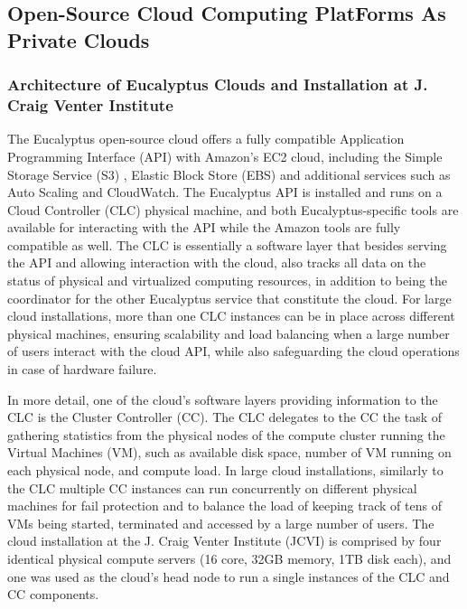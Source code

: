 \documentclass[10pt]{bmc_article}
\newenvironment{bmcformat}{\baselineskip20pt\sloppy\setboolean{publ}{false}}{\baselineskip20pt\sloppy}
\begin{document}
\begin{bmcformat}
\subsection*{Open-Source Cloud Computing PlatForms As Private Clouds} 

\subsubsection*{Architecture of Eucalyptus Clouds and Installation at J. Craig Venter Institute}

The Eucalyptus open-source cloud \cite{euca} offers a fully compatible Application Programming Interface (API) with Amazon’s EC2 cloud, 
including the Simple Storage  Service (S3) \cite{s3},  Elastic Block Store (EBS) \cite{EBS} and additional services such as Auto Scaling and 
CloudWatch. The Eucalyptus API  is installed and runs on a Cloud Controller (CLC) physical machine, and both Eucalyptus-specific tools are available 
for interacting with the API \cite{euca2ools} while the Amazon tools \cite{aws2ools} are fully compatible as well. The CLC is essentially a software 
layer that besides serving the API and allowing interaction with the cloud, also tracks all data on the status of physical and virtualized computing resources, 
in addition to being the coordinator for the other Eucalyptus service that constitute the cloud. For large cloud installations, more than one CLC
instances can be in place across different physical machines, ensuring scalability and load balancing when a large number of users 
interact with the cloud API, while also safeguarding the cloud operations in case of hardware failure.

In more detail, one of the cloud's software layers providing information to the CLC is the Cluster Controller (CC). The CLC delegates to the CC  
the task of gathering statistics from the physical nodes of the compute cluster running the Virtual Machines (VM), such as available disk space, 
number of VM running on each physical node, and compute load.  In large cloud installations, similarly to the CLC multiple CC instances can run 
concurrently on different physical machines for fail protection and to balance the load of keeping track of tens of VMs being started, terminated
and accessed by a large number of users. The cloud installation at  the J. Craig Venter Institute (JCVI) is comprised by four identical physical compute 
servers (16 core, 32GB memory, 1TB disk each), and one was used as the cloud's head node to run a single instances of the CLC and CC components.


\end{bmcformat}
\end{document}
